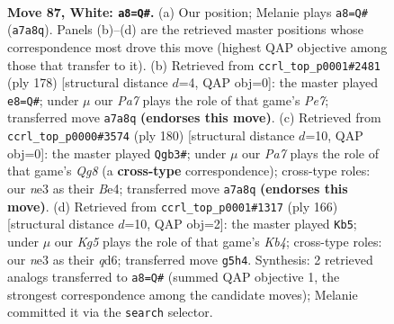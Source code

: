 \documentclass[11pt]{article}
\begin{document}
\clearpage

\begin{figure}[p]\centering
\begin{subfigure}{0.46\textwidth}\centering
\resizebox{\linewidth}{!}{%
\newchessgame
\chessboard[
  setfen={7k/P4Q2/8/6K1/8/4n3/8/8 w - - 5 87},
  showmover=false,
  pgfstyle=straightmove, color=movearrow, markmove={a7-a8}
]}
\caption{}
\end{subfigure}\hfill
\begin{subfigure}{0.46\textwidth}\centering
\resizebox{\linewidth}{!}{%
\newchessgame
\chessboard[
  setfen={k5K1/3QP3/8/8/8/8/8/8 w - - 1 90},
  showmover=false,
  pgfstyle=straightmove, color=movearrow, markmove={e7-e8}
]}
\caption{}
\end{subfigure}
\\[4pt]
\begin{subfigure}{0.46\textwidth}\centering
\resizebox{\linewidth}{!}{%
\newchessgame
\chessboard[
  setfen={6Q1/8/7K/1k6/4B3/Q7/8/8 w - - 3 91},
  showmover=false,
  pgfstyle=straightmove, color=movearrow, markmove={g8-b3}
]}
\caption{}
\end{subfigure}\hfill
\begin{subfigure}{0.46\textwidth}\centering
\resizebox{\linewidth}{!}{%
\newchessgame
\chessboard[
  setfen={8/P5Q1/3q4/5p2/1K6/5k2/8/8 w - - 4 84},
  showmover=false,
  pgfstyle=straightmove, color=movearrow, markmove={b4-b5}
]}
\caption{}
\end{subfigure}
\caption{\textbf{Move 87, White: \texttt{a8=Q\#}.} (a) Our position; Melanie plays \texttt{a8=Q\#} (\texttt{a7a8q}). Panels (b)--(d) are the retrieved master positions whose correspondence most drove this move (highest QAP objective among those that transfer to it). (b) Retrieved from \texttt{ccrl\_top\_p0001\#2481} (ply 178) [structural distance $d$=4, QAP obj=0]: the master played \texttt{e8=Q\#}; under $\mu$ our \emph{Pa7} plays the role of that game's \emph{Pe7}; transferred move \texttt{a7a8q} \textbf{(endorses this move)}. (c) Retrieved from \texttt{ccrl\_top\_p0000\#3574} (ply 180) [structural distance $d$=10, QAP obj=0]: the master played \texttt{Qgb3\#}; under $\mu$ our \emph{Pa7} plays the role of that game's \emph{Qg8} (a \textbf{cross-type} correspondence); cross-type roles: our \emph{n}e3 as their \emph{B}e4; transferred move \texttt{a7a8q} \textbf{(endorses this move)}. (d) Retrieved from \texttt{ccrl\_top\_p0001\#1317} (ply 166) [structural distance $d$=10, QAP obj=2]: the master played \texttt{Kb5}; under $\mu$ our \emph{Kg5} plays the role of that game's \emph{Kb4}; cross-type roles: our \emph{n}e3 as their \emph{q}d6; transferred move \texttt{g5h4}. Synthesis: 2 retrieved analogs transferred to \texttt{a8=Q\#} (summed QAP objective 1, the strongest correspondence among the candidate moves); Melanie committed it via the \texttt{search} selector.}
\label{fig:thought-m172}
\end{figure}
\end{document}
